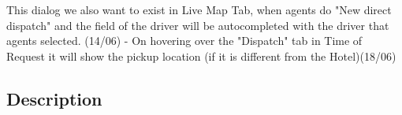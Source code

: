 This dialog we also want to exist in Live Map Tab, when agents do "New direct dispatch" and the field of the driver will be autocompleted with the driver that agents selected. (14/06)
-
On hovering over the "Dispatch" tab in Time of Request it will show the pickup location (if it is different from the Hotel)(18/06)








\subsection{Description}

